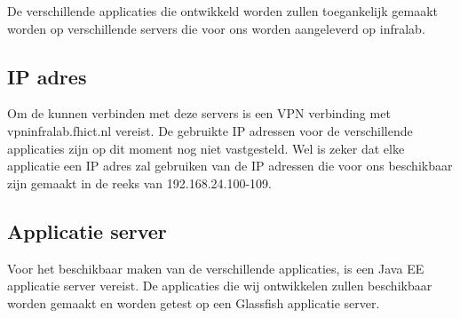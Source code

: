 De verschillende applicaties die ontwikkeld worden zullen toegankelijk gemaakt worden op verschillende servers die voor ons worden aangeleverd op infralab.

\subsection{IP adres}

Om de kunnen verbinden met deze servers is een VPN verbinding met vpninfralab.fhict.nl vereist. De gebruikte IP adressen voor de verschillende applicaties zijn op dit moment nog niet vastgesteld. Wel is zeker dat elke applicatie een IP adres zal gebruiken van de IP adressen die voor ons beschikbaar zijn gemaakt in de reeks van 192.168.24.100-109.

\subsection{Applicatie server}
Voor het beschikbaar maken van de verschillende applicaties, is een Java EE applicatie server vereist. De applicaties die wij ontwikkelen zullen beschikbaar worden gemaakt en worden getest op een Glassfish applicatie server.